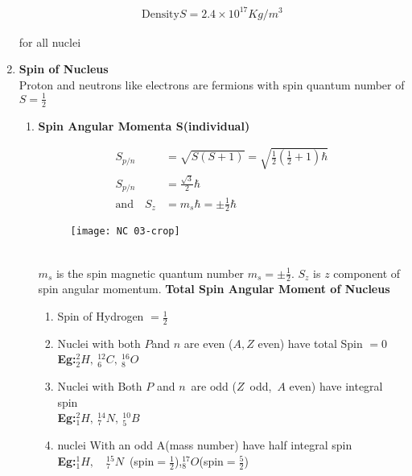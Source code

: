 \begin{enumerate}
\begin{center}
{{			\begin{align*}
			\text{Density}S=2.4\times10^{17}Kg/m^3
			\end{align*}} }
\end{center}
for all nuclei
\item \textbf{Spin of Nucleus}\\
Proton and neutrons like electrons are fermions with spin quantum number of $S=\frac{1}{2}$
\begin{enumerate}
	\item \textbf{Spin Angular Momenta S(individual)}$\left. \right. $\\
\begin{minipage}{0.45\textwidth}
	\begin{align*}
	S_{p/n}&=\sqrt{S(S+1)}=\sqrt{\frac{1}{2}\left(\frac{1}{2} +1\right) \hbar}\\
	S_{p/n}&=\frac{\sqrt{3}}{2}\hbar\\
	\text{and}\quad
	S_z&=m_s\hbar=\pm\frac{1}{2}\hbar
	\end{align*}
\end{minipage}
\begin{minipage}{0.30\textwidth}
	\begin{figure}[H]
		\centering
		\texttt{[image: NC 03-crop]}
		\caption{}
		\label{Decreasing Function}
	\end{figure}
\end{minipage}\\
$m_s$ is the spin magnetic quantum number $m_s=\pm\frac{1}{2}$. $S_z$ is $z $ component of spin angular momentum.
 \textbf{Total Spin Angular Moment of Nucleus}\\
 \begin{enumerate}
 	\item Spin of Hydrogen $=\frac{1}{2}$\\
 	\item Nuclei with both $P$and $n$ are even ($A,Z$ even) have total 
 	Spin $=0$\\
 	\textbf{Eg:}\quad $^2_2 H,\  ^{12}_6 C,\ ^{16}_8 O$\\
 	\item Nuclei with Both $P$ and $n$\ are odd ($Z$\ odd,\ $A$ even) have 
 	integral spin\\
 	\textbf{Eg:}\quad $^2_1 H,\  ^{14}_7 N,\ ^{10}_5 B$\\
 	\item nuclei With an odd A(mass number) have half integral spin\\
 	\textbf{Eg:}\quad $^1_1 H,\quad ^{15}_7 N$\ (spin$=\frac{1}{2}$),\quad$^{17}_8 O$(spin$=\frac{5}{2}$)\\

\end{enumerate}
\end{enumerate}
\end{enumerate}
